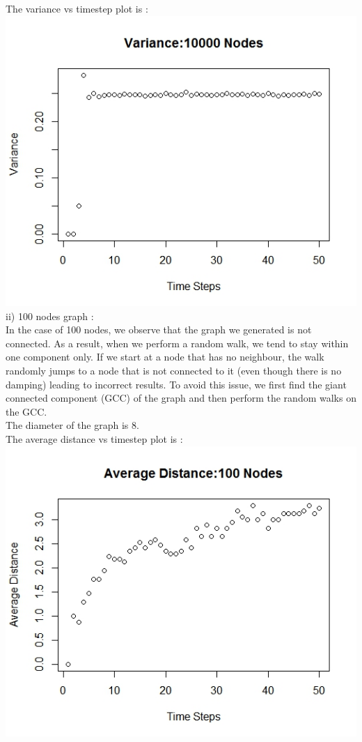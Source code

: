 \documentclass{article}
\begin{document}
The variance vs timestep plot is :\\
\includegraphics[scale=0.4]{p1j} \\
ii) 100 nodes graph :\\
In the case of 100 nodes, we observe that the graph we generated is not connected.
As a result, when we perform a random walk, we tend to stay within one component only. If we
start at a node that has no neighbour, the walk randomly jumps to a node that is not connected to it
(even though there is no damping) leading to incorrect results. To avoid this issue, we first find the 
giant connected component (GCC) of the graph and then perform the random walks on the GCC.\\
The diameter of the graph is 8.\\
The average distance vs timestep plot is :\\
\includegraphics[scale=0.4]{p1d} \\
\end{document}
